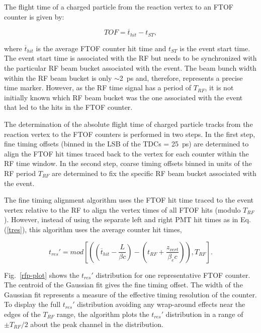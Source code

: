\documentclass{elsart}
\begin{document}
The flight time of a charged particle from the reaction vertex to an FTOF counter is given by:

\begin{equation}
TOF = \overline{t}_{hit} - t_{ST},
\end{equation}

\noindent
where $\overline{t}_{hit}$ is the average FTOF counter hit time and $t_{ST}$ is the event start time.
The event start time is associated with the RF but needs to be synchronized with the particular RF
beam bucket associated with the event. The beam bunch width within the RF beam bucket is only
$\sim$2~ps and, therefore, represents a precise time marker. However, as the RF time signal has a
period of $T_{RF}$, it is not initially known which RF beam bucket was the one associated with the
event that led to the hits in the FTOF counter.

The determination of the absolute flight time of charged particle tracks from the reaction vertex
to the FTOF counters is performed in two steps. In the first step, fine timing offsets (binned in the
LSB of the TDCs = 25~ps) are determined to align the FTOF hit times traced back to the vertex for
each counter within the RF time window. In the second step, coarse timing offsets binned in units of the
RF period $T_{RF}$ are determined to fix the specific RF beam bucket associated with the event.

The fine timing alignment algorithm uses the FTOF hit time traced to the event vertex relative to the RF
to align the vertex times of all FTOF hits (modulo $T_{RF}$). However, instead of using the separate
left and right PMT hit times as in Eq.(\ref{tres}), this algorithm uses the average counter hit times, 

\begin{equation}
t_{res}' = mod \left[ \left( \left(\overline{t}_{hit} - \frac{L}{\beta c} \right) -
\left(t_{RF} + \frac{z_{vert}}{\beta_e c} \right) \right), T_{RF} \right].
\end{equation}

Fig.~\ref{rfp-plot} shows the $t_{res}'$ distribution for one representative FTOF counter. The centroid
of the Gaussian fit gives the fine timing offset. The width of the Gaussian fit represents a measure of the
effective timing resolution of the counter. To display the full $t_{res}'$ distribution avoiding any
wrap-around effects near the edges of the $T_{RF}$ range, the algorithm plots the $t_{res}'$ distribution
in a range of $\pm T_{RF}/2$ about the peak channel in the distribution.
\end{document}
